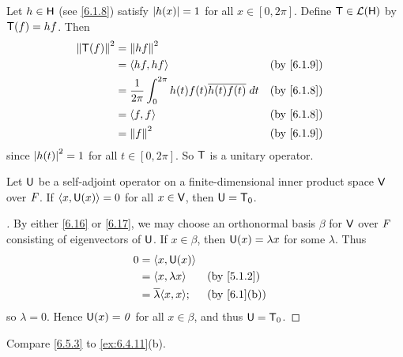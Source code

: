 \begin{eg}\label{6.5.2}
  Let \(h \in \mathsf{H}\) (see \cref{6.1.8}) satisfy \(\left\lvert h(x)\right\rvert = 1\) for all \(x \in [0, 2 \pi]\).
  Define \(\mathsf{T} \in \mathcal{L}(\mathsf{H})\) by \(\mathsf{T}(f) = hf\).
  Then
  \begin{align*}
    \norm{\T(f)}^2 & = \norm{hf}^2                                                                      \\
                   & = \inn{hf, hf}                                                     &  & \by{6.1.9} \\
                   & = \dfrac{1}{2 \pi} \int_0^{2 \pi} h(t) f(t) \conj{h(t) f(t)} \; dt &  & \by{6.1.8} \\
                   & = \inn{f, f}                                                       &  & \by{6.1.8} \\
                   & = \norm{f}^2                                                       &  & \by{6.1.9}
  \end{align*}
  since \(\left\lvert h(t)\right\rvert^2 = 1\) for all \(t \in [0, 2 \pi]\).
  So \(\mathsf{T}\) is a unitary operator.
\end{eg}

\begin{lem}\label{6.5.3}
  Let \(\mathsf{U}\) be a self-adjoint operator on a finite-dimensional inner product space \(\mathsf{V}\) over \(\mathit{F}\).
  If \(\left\langle x, \mathsf{U}(x)\right\rangle = 0\) for all \(x \in \mathsf{V}\), then \(\mathsf{U} = \mathsf{T}_0\).
\end{lem}

\begin{proof}[]
  By either \cref{6.16} or \cref{6.17}, we may choose an orthonormal basis \(\beta\) for \(\mathsf{V}\) over \(\mathit{F}\) consisting of eigenvectors of \(\mathsf{U}\).
  If \(x \in \beta\), then \(\mathsf{U}(x) = \lambda x\) for some \(\lambda\).
  Thus
  \begin{align*}
    0 & = \inn{x, \U(x)}                              \\
      & = \inn{x, \lambda x}         &  & \by{5.1.2}  \\
      & = \conj{\lambda} \inn{x, x}; &  & \by{6.1}[b]
  \end{align*}
  so \(\lambda = 0\).
  Hence \(\mathsf{U}(x) = \mathit{0}\) for all \(x \in \beta\), and thus \(\mathsf{U} = \mathsf{T}_0\).
\end{proof}

\begin{note}
  Compare \cref{6.5.3} to \cref{ex:6.4.11}(b).
\end{note}

